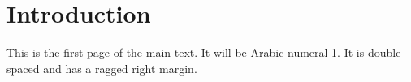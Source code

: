 \documentclass{SJSUthesis}
\begin{document}
\makefrontmatter




\startprelimnumbering 



\clearpage
\tableofcontents

\clearpage
\listoftables

\clearpage
\listoffigures

\makemainmatter

\section{Introduction}
This is the first page of the main text. It will be Arabic numeral 1. It is double-spaced and has a ragged right margin. 
\end{document}
